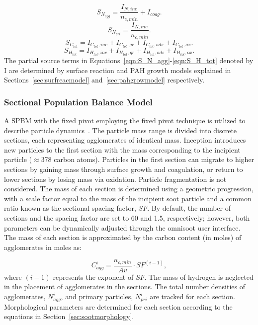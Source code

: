 \begin{equation}
	S_{N_{agg}} = \frac{I_{N,inc}}{n_{c,min}}+I_{coag}
	\label{eqn:S_N_agg}.
\end{equation}
\begin{equation}
	S_{N_{pri}} = \frac{I_{N,inc}}{n_{c,min}}
	\label{eqn:S_N_pri}.
\end{equation}
\begin{equation}
	S_{C_{tot}} = I_{C_{tot},inc}+I_{C_{tot},gr}+I_{C_{tot},ads}+I_{C_{tot},ox}
	\label{eqn:S_C_tot}.
\end{equation}
\begin{equation}
	S_{H_{tot}} = I_{H_{tot},inc}+I_{H_{tot},gr}+I_{H_{tot},ads}+I_{H_{tot},ox}
	\label{eqn:S_H_tot}.
\end{equation}
The partial source terms in Equations~\ref{eqn:S_N_agg}-\ref{eqn:S_H_tot} denoted by $\mathrm{I}$ are determined by surface reaction and PAH growth models explained in Sections~\ref{sec:surfreacmodel} and~\ref{sec:pahgrowmodel} respectively.

\subsubsection{Sectional Population Balance Model}
A SPBM with the fixed pivot employing the fixed pivot technique is utilized to describe particle dynamics~\citep{wu1988discrete}. The particle mass range is divided into discrete sections, each representing agglomerates of identical mass. Inception introduces new particles to the first section with the mass corresponding to the incipient particle ($\approx$378 carbon atoms). Particles in the first section can migrate to higher sections by gaining mass through surface growth and coagulation, or return to lower sections by losing mass via oxidation. Particle fragmentation is not considered. The mass of each section is determined using a geometric progression, with a scale factor equal to the mass of the incipient soot particle and a common ratio known as the sectional spacing factor, $SF$. By default, the number of sections and the spacing factor are set to 60 and 1.5, respectively; however, both parameters can be dynamically adjusted through the omnisoot user interface. The mass of each section is approximated by the carbon content (in moles) of agglomerates in moles as:

\begin{equation}
	C^i_{agg} = \frac{n_{c,min}}{Av}\cdot SF^{(i-1)},
	\label{eqn:Caggsec}
\end{equation}
  \noindent  where $(i-1)$ represents the exponent of $SF$. The mass of hydrogen is neglected in the placement of agglomerates in the sections.
The total number densities of agglomerates, ${N^i_{agg}}$, and primary particles, ${N^i_{pri}}$ are tracked for each section. Morphological parameters are determined for each section according to the equations in Section~\ref{sec:sootmorphology}.


